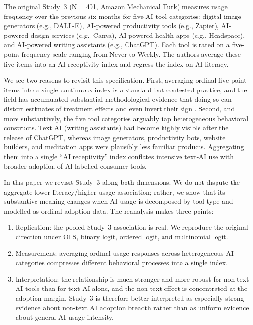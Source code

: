 \documentclass[11pt]{article}
\begin{document}
The original Study~3 (N$=$401, Amazon Mechanical Turk) measures usage frequency
over the previous six months for five AI tool categories: digital image
generators (e.g., DALL-E), AI-powered productivity tools (e.g., Zapier),
AI-powered design services (e.g., Canva), AI-powered health apps (e.g.,
Headspace), and AI-powered writing assistants (e.g., ChatGPT). Each tool is
rated on a five-point frequency scale ranging from Never to
Weekly. The authors average these five items into an AI receptivity
index and regress the index on AI literacy.

We see two reasons to revisit this specification. First, averaging ordinal
five-point items into a single continuous index is a standard but contested
practice, and the field has accumulated substantial methodological evidence
that doing so can distort estimates of treatment effects and even invert their
sign \citep{liddell2018analyzing,agresti2010analysis}. Second, and more
substantively, the five tool categories arguably tap heterogeneous behavioral
constructs. Text AI (writing assistants) had become highly visible after the
release of ChatGPT, whereas image generators, productivity bots, website
builders, and meditation apps were plausibly less familiar products.
Aggregating them
into a single ``AI receptivity'' index conflates intensive text-AI use with
broader adoption of AI-labelled consumer tools.

In this paper we revisit Study~3 along both dimensions. We do not dispute the
aggregate lower-literacy/higher-usage association; rather, we show that its
substantive meaning changes when AI usage is decomposed by tool type and
modelled as ordinal adoption data. The reanalysis makes three points:

\begin{enumerate}
  \item Replication: the pooled Study~3 association is real. We
  reproduce the original direction under OLS, binary logit, ordered logit,
  and multinomial logit.
  \item Measurement: averaging ordinal usage responses across
  heterogeneous AI categories compresses different behavioral processes into a
  single index.
  \item Interpretation: the relationship is much stronger and more robust for
  non-text AI tools than for text AI alone, and the non-text effect is
  concentrated at the adoption margin. Study~3 is therefore better interpreted
  as especially strong evidence about non-text AI adoption breadth rather than
  as uniform evidence about general AI usage intensity.
\end{enumerate}
\end{document}
